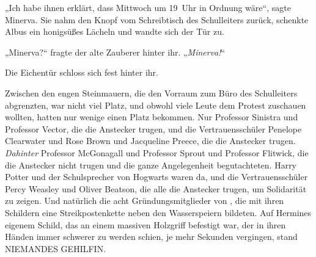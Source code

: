 „Ich habe ihnen erklärt, dass Mittwoch um 19~Uhr in Ordnung wäre“, sagte Minerva. Sie nahm den Knopf vom Schreibtisch des Schulleiters zurück, schenkte Albus ein honigsüßes Lächeln und wandte sich der Tür zu.

„Minerva?“ fragte der alte Zauberer hinter ihr.
„\emph{Minerva!}“

Die Eichentür schloss sich fest hinter ihr.

\later

Zwischen den engen Steinmauern, die den Vorraum zum Büro des Schulleiters abgrenzten, war nicht viel Platz, und obwohl viele Leute dem Protest zuschauen wollten, hatten nur wenige einen Platz bekommen. Nur Professor Sinistra und Professor Vector, die die Anstecker trugen, und die Vertrauensschüler Penelope Clearwater und Rose Brown und Jacqueline Preece, die die Anstecker trugen. \emph{Dahinter} Professor McGonagall und Professor Sprout und Professor Flitwick, die die Anstecker nicht trugen und die ganze Angelegenheit begutachteten. Harry Potter und der Schulsprecher von Hogwarts waren da, und die Vertrauensschüler Percy Weasley und Oliver Beatson, die alle die Anstecker trugen, um Solidarität zu zeigen. Und natürlich die acht Gründungsmitglieder von \SPHEW, die mit ihren Schildern eine Streikpostenkette neben den Wasserspeiern bildeten. Auf Hermines eigenem Schild, das an einem massiven Holzgriff befestigt war, der in ihren Händen immer schwerer zu werden schien, je mehr Sekunden vergingen, stand NIEMANDES GEHILFIN.

